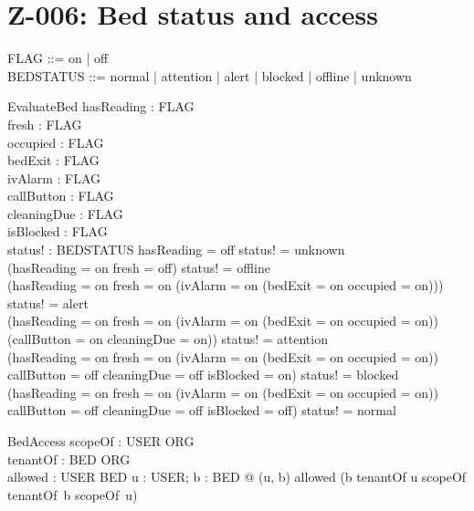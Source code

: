 \documentclass{article}
\begin{document}
\section*{Z-006: Bed status and access}

\begin{zed}
\end{zed}

\begin{zed}
  FLAG ::= on | off \\
  BEDSTATUS ::= normal | attention | alert | blocked | offline | unknown
\end{zed}

\begin{schema}{EvaluateBed}
  hasReading : FLAG \\
  fresh : FLAG \\
  occupied : FLAG \\
  bedExit : FLAG \\
  ivAlarm : FLAG \\
  callButton : FLAG \\
  cleaningDue : FLAG \\
  isBlocked : FLAG \\
  status! : BEDSTATUS
\where
  hasReading = off \iff status! = unknown \\
  (hasReading = on \land fresh = off) \iff status! = offline \\
  (hasReading = on \land fresh = on \land
    (ivAlarm = on \lor (bedExit = on \land occupied = on))) \iff status! = alert \\
  (hasReading = on \land fresh = on \land \lnot (ivAlarm = on \lor (bedExit = on \land occupied = on))
    \land (callButton = on \lor cleaningDue = on)) \iff status! = attention \\
  (hasReading = on \land fresh = on \land \lnot (ivAlarm = on \lor (bedExit = on \land occupied = on))
    \land callButton = off \land cleaningDue = off \land isBlocked = on) \iff status! = blocked \\
  (hasReading = on \land fresh = on \land \lnot (ivAlarm = on \lor (bedExit = on \land occupied = on))
    \land callButton = off \land cleaningDue = off \land isBlocked = off) \iff status! = normal
\end{schema}

\begin{schema}{BedAccess}
  scopeOf : USER \pfun \power ORG \\
  tenantOf : BED \pfun ORG \\
  allowed : USER \rel BED
\where
  \forall u : USER; b : BED @ (u, b) \in allowed \iff
    (b \in \dom tenantOf \land u \in \dom scopeOf \land tenantOf~b \in scopeOf~u)
\end{schema}
\end{document}
